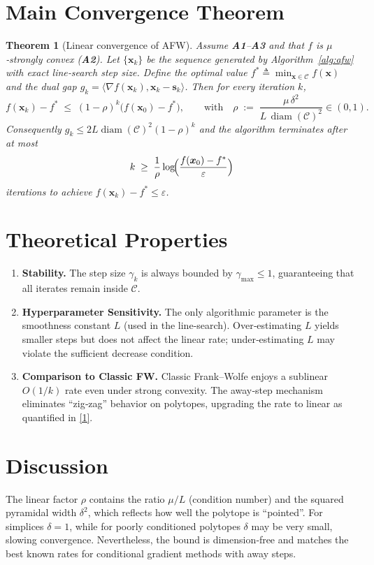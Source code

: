 \documentclass{article}
\newtheorem{theorem}{Theorem}
\newcommand{\diam}{\operatorname*{diam}}
\begin{document}
\section*{Main Convergence Theorem}
\begin{theorem}[Linear convergence of AFW]\label{thm:linear}
Assume \textbf{A1}–\textbf{A3} and that $f$ is $\mu$‑strongly convex (\textbf{A2}).  
Let $\{ \bm{x}_{k}\}$ be the sequence generated by Algorithm~\ref{alg:afw} with exact line‑search step size.  
Define the optimal value $f^{*}\triangleq\min_{\bm{x}\in\mathcal{C}}f(\bm{x})$ and the dual gap $g_{k}= \langle\nabla f(\bm{x}_{k}),\bm{x}_{k}-\bm{s}_{k}\rangle$.  
Then for every iteration $k$,
\[
f(\bm{x}_{k})-f^{*}\;\le\;(1-\rho)^{k}\bigl(f(\bm{x}_{0})-f^{*}\bigr),
\qquad\text{with}\quad 
\rho\;:=\;\frac{\mu\,\delta^{2}}{L\,\diam(\mathcal{C})^{2}}\in(0,1). \tag{1}
\]
Consequently $g_{k}\le 2L\diam(\mathcal{C})^{2}(1-\rho)^{k}$ and the algorithm terminates after at most
\[
k\;\ge\; \frac{1}{\rho}\log\!\Bigl(\frac{f(\bm{x}_{0})-f^{*}}{\varepsilon}\Bigr)
\]
iterations to achieve $f(\bm{x}_{k})-f^{*}\le\varepsilon$.
\end{theorem}

\section*{Theoretical Properties}
\begin{enumerate}[label=\textbf{P\arabic*:}, leftmargin=*]
  \item \textbf{Stability.} The step size $\gamma_{k}$ is always bounded by $\gamma_{\max}\le 1$, guaranteeing that all iterates remain inside $\mathcal{C}$.
  \item \textbf{Hyperparameter Sensitivity.} The only algorithmic parameter is the smoothness constant $L$ (used in the line‑search). Over‑estimating $L$ yields smaller steps but does not affect the linear rate; under‑estimating $L$ may violate the sufficient decrease condition.
  \item \textbf{Comparison to Classic FW.} Classic Frank–Wolfe enjoys a sublinear $O(1/k)$ rate even under strong convexity. The away‑step mechanism eliminates ``zig‑zag'' behavior on polytopes, upgrading the rate to linear as quantified in \eqref{1}.
\end{enumerate}

\section*{Discussion}
The linear factor $\rho$ contains the ratio $\mu/L$ (condition number) and the squared pyramidal width $\delta^{2}$, which reflects how well the polytope is “pointed”.  For simplices $\delta=1$, while for poorly conditioned polytopes $\delta$ may be very small, slowing convergence.  Nevertheless, the bound is dimension‑free and matches the best known rates for conditional gradient methods with away steps.
\end{document}
